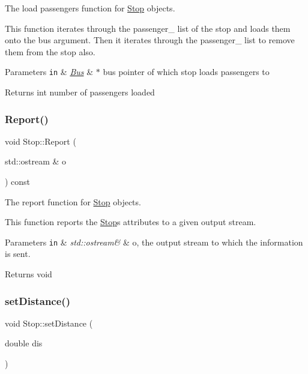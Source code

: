 The load passengers function for \hyperlink{classStop}{Stop} objects. 

This function iterates through the passenger\+\_\+ list of the stop and loads them onto the bus argument. Then it iterates through the passenger\+\_\+ list to remove them from the stop also.


\begin{DoxyParams}[1]{Parameters}
\mbox{\tt in}  & {\em \hyperlink{classBus}{Bus}} & $\ast$ bus pointer of which stop loads passengers to\\
\hline
\end{DoxyParams}
\begin{DoxyReturn}{Returns}
int number of passengers loaded 
\end{DoxyReturn}
\mbox{\label{classStop_a8e286b7cca2dce6977ebda6f01805d94}} 
\subsubsection{\texorpdfstring{Report()}{Report()}}
{\footnotesize\ttfamily void Stop\+::\+Report (\begin{DoxyParamCaption}\item[{std\+::ostream \&}]{o }\end{DoxyParamCaption}) const}



The report function for \hyperlink{classStop}{Stop} objects. 

This function reports the \hyperlink{classStop}{Stop}\textquotesingle{}s attributes to a given output stream.


\begin{DoxyParams}[1]{Parameters}
\mbox{\tt in}  & {\em std\+::ostream\&} & o, the output stream to which the information is sent.\\
\hline
\end{DoxyParams}
\begin{DoxyReturn}{Returns}
void 
\end{DoxyReturn}
\mbox{\label{classStop_af26acbcbca66d3a36ce01bc662e2e892}} 
\subsubsection{\texorpdfstring{set\+Distance()}{setDistance()}}
{\footnotesize\ttfamily void Stop\+::set\+Distance (\begin{DoxyParamCaption}\item[{double}]{dis }\end{DoxyParamCaption})}



